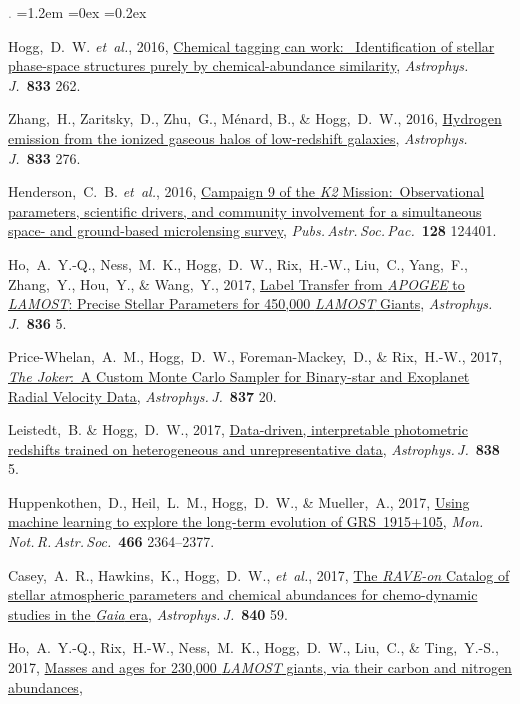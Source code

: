 \documentclass[10pt,letterpaper]{article}
\newcommand{\acronym}[1]{{\small{#1}}}
\newcommand{\foreign}[1]{\textsl{#1}}
\newcommand{\etal}{\foreign{et~al.}}
\newcommand{\project}[1]{\textsl{#1}}
\newcommand{\doi}[2]{\href{http://dx.doi.org/#1}{{#2}}}
\newcommand{\deemph}[1]{\textcolor{grey}{\footnotesize{#1}}}
\newcommand{\pubnumber}[1]{\deemph{{#1}.}}
\newcounter{refpubnum}
\newcommand{\hogglist}{%
    \rightmargin=0in
    \leftmargin=1.2em
    \topsep=0ex
    \partopsep=0pt
    \itemsep=0.2ex
    \parsep=0pt
    \itemindent=-1.0\leftmargin
    \listparindent=0.0\leftmargin
    \settowidth{\labelsep}{~}
    \usecounter{refpubnum}
  }
\begin{document}
\begin{list}{\pubnumber{\therefpubnum}}{\hogglist}
\item
Hogg,~D.~W. \etal, 2016,
\doi{10.3847/1538-4357/833/2/262}{Chemical tagging can work:\ %
Identification of stellar phase-space structures purely by chemical-abundance similarity},
\textit{Astrophys.\,J.}\ \textbf{833} 262.
\item
Zhang,~H., Zaritsky,~D., Zhu,~G., M\'enard, B., \& Hogg,~D.~W., 2016,
\doi{10.3847/1538-4357/833/2/276}{Hydrogen emission from the ionized gaseous halos of low-redshift galaxies},
\textit{Astrophys.\,J.}\ \textbf{833} 276.
\item
Henderson,~C.~B. \etal, 2016,
\doi{10.1088/1538-3873/128/970/124401}{Campaign 9 of the \project{\acronym{K2}} Mission:\ 
Observational parameters, scientific drivers, and community involvement
for a simultaneous space- and ground-based microlensing survey},
\textit{Pubs.\,Astr.\,Soc.\,Pac.}\ \textbf{128} 124401.
\item
Ho,~A.~Y.-Q., Ness,~M.~K., Hogg,~D.~W., Rix,~H.-W., Liu,~C., Yang,~F., Zhang,~Y.,
Hou,~Y., \& Wang,~Y., 2017,
\doi{10.3847/1538-4357/836/1/5}{Label Transfer from \project{\acronym{APOGEE}} to \project{\acronym{LAMOST}}: Precise Stellar Parameters for 450,000 \project{\acronym{LAMOST}} Giants},
\textit{Astrophys.\,J.}\ \textbf{836} 5.
\item
Price-Whelan,~A.~M., Hogg,~D.~W., Foreman-Mackey,~D., \& Rix,~H.-W., 2017,
\doi{10.3847/1538-4357/aa5e50}{\project{The Joker}:\ A Custom Monte Carlo Sampler for Binary-star and Exoplanet Radial Velocity Data},
\textit{Astrophys.\,J.}\ \textbf{837} 20.
\item
Leistedt,~B. \& Hogg,~D.~W., 2017,
\doi{10.3847/1538-4357/aa6332}{Data-driven, interpretable photometric redshifts trained on heterogeneous and unrepresentative data},
\textit{Astrophys.\,J.}\ \textbf{838} 5.
\item
Huppenkothen,~D., Heil,~L.~M., Hogg,~D.~W., \& Mueller,~A., 2017,
\doi{10.1093/mnras/stw3190}{Using machine learning to explore the long-term evolution of \acronym{GRS~1915+105}},
\textit{Mon.\,Not.\,R.\,Astr.\,Soc.}\ \textbf{466} 2364--2377.
\item
Casey,~A.~R., Hawkins,~K., Hogg,~D.~W., \etal, 2017,
\doi{10.3847/1538-4357/aa69c2}{The \project{\acronym{RAVE}-on} Catalog of stellar atmospheric parameters and chemical abundances for chemo-dynamic studies in the \project{Gaia} era},
\textit{Astrophys.\,J.}\ \textbf{840} 59.
\item
Ho,~A.~Y.-Q., Rix,~H.-W., Ness,~M.~K., Hogg,~D.~W., Liu,~C., \& Ting,~Y.-S., 2017,
\doi{10.3847/1538-4357/aa6db3}{Masses and ages for 230,000 \project{\acronym{LAMOST}} giants, via their carbon and nitrogen abundances},

\end{list}
\end{document}
